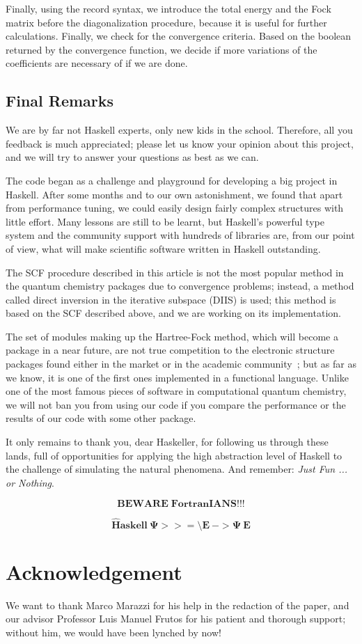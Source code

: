 \documentclass{tmr}
\begin{document}
Finally, using the record syntax, we introduce the
total energy and the Fock matrix before the diagonalization procedure,
because it is useful for further calculations. Finally, we 
check for the convergence criteria. Based
on the boolean returned by the convergence function, we decide if more
variations of the coefficients are necessary of if we are done.

\subsection{Final Remarks}

We are by far not Haskell experts, only new kids in the school. Therefore, all
you feedback is much appreciated; please let us know your opinion about
this project, and we will try to answer your questions as best as we can.

The code began as a challenge and playground for developing a big project 
in Haskell. After some months and to our own astonishment, we found that
apart from performance tuning, we could
easily design fairly complex structures with little effort. Many lessons 
are still to be learnt, but Haskell's powerful type system and the
community support with hundreds of libraries are, from our point of view, what will make 
scientific software written in Haskell outstanding.

The SCF procedure described in this article is not the most popular method in
the quantum chemistry packages due to convergence problems; instead, a
method called direct inversion in the iterative subspace (DIIS) is used; this method is
based on the SCF described above, and we are working on its implementation.

The set of modules making up the Hartree-Fock method, which will 
become a package in a near future, are not true competition
to the electronic structure packages found either in the market
or in the academic community~\cite{software};
but as far as we know, it is one of the first ones implemented in a 
functional language. Unlike one of the
most famous pieces of software in computational quantum chemistry, we
will not ban you from using our code if you
compare the performance or the results of our code with some
other package.~\cite{banned}

It only remains to thank you, dear Haskeller, for following us through these
lands, full of opportunities for applying the high abstraction level
of Haskell to the challenge of simulating the natural phenomena. And
remember: \textit{Just Fun ... or Nothing}.

\[\mathbf{BEWARE\;FortranIANS!!!} \]


\[\mathbf{\hat{H}askell\: \Psi >>= \setminus E\: -> \Psi\: E }\]

\section{Acknowledgement}

We want to thank Marco Marazzi for his help
in the redaction of the paper, and our advisor
Professor Luis Manuel Frutos for his patient
and thorough support; without
him, we would have been lynched by now!

\begingroup
\raggedright

\endgroup
\end{document}
